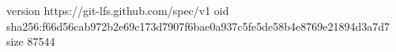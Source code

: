 version https://git-lfs.github.com/spec/v1
oid sha256:f66d56cab972b2e69c173d7907f6bae0a937c5fe5de58b4e8769e21894d3a7d7
size 87544
